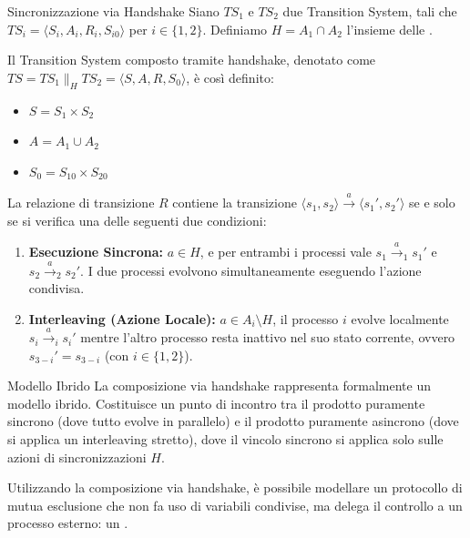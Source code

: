 \begin{definition}{Sincronizzazione via Handshake}
  Siano \(TS_1\) e \(TS_2\) due Transition System, tali che \(TS_i = \langle S_i, A_i, R_i, S_{i0} \rangle\) per \(i \in \{1, 2\}\).
  Definiamo \(H = A_1 \cap A_2\) l'insieme delle .

  Il Transition System composto tramite handshake, denotato come \(TS = TS_1 \parallel_H TS_2 = \langle S, A, R, S_0 \rangle\), è così definito:
  \begin{itemize}
    \item \(S = S_1 \times S_2\) 
    \item \(A = A_1 \cup A_2\) 
    \item \(S_0 = S_{10} \times S_{20}\) 
  \end{itemize}

  La relazione di transizione \(R\) contiene la transizione \(\langle s_1, s_2 \rangle \xrightarrow{a} \langle s_1', s_2' \rangle\) se e solo se si verifica una delle seguenti due condizioni:
  \begin{enumerate}
    \item \textbf{Esecuzione Sincrona:} \(a \in H\), e per entrambi i processi vale \(s_1 \xrightarrow{a}_1 s_1'\) e \(s_2 \xrightarrow{a}_2 s_2'\). I due processi evolvono simultaneamente eseguendo l'azione condivisa.
    \item \textbf{Interleaving (Azione Locale):} \(a \in A_i \setminus H\), il processo \(i\) evolve localmente \(s_i \xrightarrow{a}_i s_i'\) mentre l'altro processo resta inattivo nel suo stato corrente, ovvero \(s_{3-i}' = s_{3-i}\) (con \(i \in \{1, 2\}\)).
  \end{enumerate}
\end{definition}

\begin{observation}{Modello Ibrido}
  La composizione via handshake rappresenta formalmente un modello ibrido. Costituisce un punto di incontro tra il prodotto puramente sincrono (dove tutto evolve in parallelo) e il prodotto puramente asincrono (dove si applica un interleaving stretto), dove il vincolo sincrono si applica solo sulle azioni di sincronizzazioni \(H\).
\end{observation}

Utilizzando la composizione via handshake, è possibile modellare un protocollo di mutua esclusione che non fa uso di variabili condivise, ma delega il controllo a un processo esterno: un .

